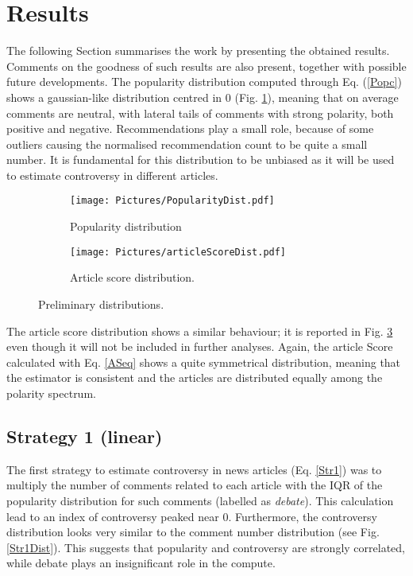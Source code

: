 \section{Results}
\label{Resul}

The following Section summarises the work by presenting the obtained results. Comments on the goodness of such results are also present, together with possible future developments. 
The popularity distribution computed through Eq. (\ref{Popc}) shows a gaussian-like distribution centred in 0 (Fig. \ref{PopDist}), meaning that on average comments are neutral, with lateral tails of comments with strong polarity, both positive and negative. Recommendations play a small role, because of some outliers causing the normalised recommendation count to be quite a small number. It is fundamental for this distribution to be unbiased as it will be used to estimate controversy in different articles. 

\begin{figure}
\centering
    \begin{subfigure}{0.5\tw}
    \centering
    \texttt{[image: Pictures/PopularityDist.pdf]}
    \caption{Popularity distribution}
    \label{PopDist}
    \end{subfigure}%
\hfill
    \begin{subfigure}{0.5\tw}
    \centering
    \texttt{[image: Pictures/articleScoreDist.pdf]}
    \caption{Article score distribution.}
    \label{AScore}
    \end{subfigure}
\caption{Preliminary distributions.}
\end{figure}

The article score distribution shows a similar behaviour; it is reported in Fig. \ref{AScore} even though it will not be included in further analyses. Again, the article Score calculated with Eq. \ref{ASeq} shows a quite symmetrical distribution, meaning that the estimator is consistent and the articles are distributed equally among the polarity spectrum.

\subsection{Strategy 1 (linear)}
The first strategy to estimate controversy in news articles (Eq. \ref{Str1}) was to multiply the number of comments related to each article with the IQR of the popularity distribution for such comments (labelled as \textit{debate}). This calculation lead to an index of controversy peaked near 0. Furthermore, the controversy distribution looks very similar to the comment number distribution (see Fig. \ref{Str1Dist}). This suggests that popularity and controversy are strongly correlated, while debate plays an insignificant role in the compute. 

